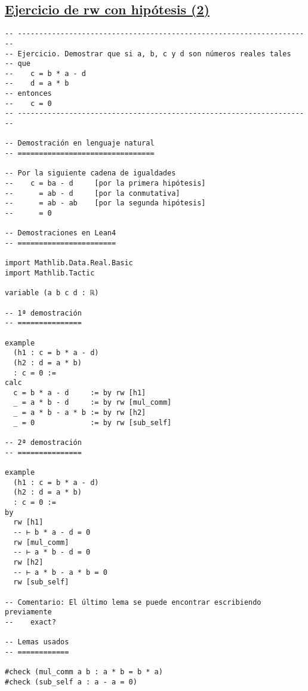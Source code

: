 \subsection{\href{./src/Basicos/Ejercicio\_de\_rw\_sobre\_hipotesis\_2.lean}{Ejercicio de rw con hipótesis (2)}}
\label{sec:orgb2875e8}
\begin{verbatim}
-- ---------------------------------------------------------------------
-- Ejercicio. Demostrar que si a, b, c y d son números reales tales
-- que
--    c = b * a - d
--    d = a * b
-- entonces
--    c = 0
-- ---------------------------------------------------------------------

-- Demostración en lenguaje natural
-- ================================

-- Por la siguiente cadena de igualdades
--    c = ba - d     [por la primera hipótesis]
--      = ab - d     [por la conmutativa]
--      = ab - ab    [por la segunda hipótesis]
--      = 0

-- Demostraciones en Lean4
-- =======================

import Mathlib.Data.Real.Basic
import Mathlib.Tactic

variable (a b c d : ℝ)

-- 1ª demostración
-- ===============

example
  (h1 : c = b * a - d)
  (h2 : d = a * b)
  : c = 0 :=
calc
  c = b * a - d     := by rw [h1]
  _ = a * b - d     := by rw [mul_comm]
  _ = a * b - a * b := by rw [h2]
  _ = 0             := by rw [sub_self]

-- 2ª demostración
-- ===============

example
  (h1 : c = b * a - d)
  (h2 : d = a * b)
  : c = 0 :=
by
  rw [h1]
  -- ⊢ b * a - d = 0
  rw [mul_comm]
  -- ⊢ a * b - d = 0
  rw [h2]
  -- ⊢ a * b - a * b = 0
  rw [sub_self]

-- Comentario: El último lema se puede encontrar escribiendo previamente
--    exact?

-- Lemas usados
-- ============

#check (mul_comm a b : a * b = b * a)
#check (sub_self a : a - a = 0)
\end{verbatim}


